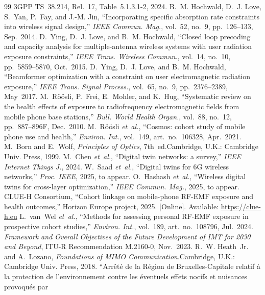 \documentclass[journal,twocolumn,10pt]{IEEEtran}
\theoremstyle{plain}
\theoremstyle{definition}
\theoremstyle{remark}
\begin{document}
\begin{thebibliography}{99}
3GPP TS~38.214, Rel.~17, Table~5.1.3.1-2, 2024.
 B.~M. Hochwald, D.~J. Love, S.~Yan, P.~Fay,
and J.-M. Jin, ``Incorporating specific absorption rate constraints
into wireless signal design,'' \emph{IEEE Commun. Mag.}, vol.~52,
no.~9, pp.~126--133, Sep.~2014.
 D.~Ying, D.~J. Love, and B.~M. Hochwald, ``Closed
loop precoding and capacity analysis for multiple-antenna wireless
systems with user radiation exposure constraints,'' \emph{IEEE
Trans. Wireless Commun.}, vol.~14, no.~10, pp.~5859--5870,
Oct.~2015.
 D.~Ying, D.~J. Love, and B.~M. Hochwald,
``Beamformer optimization with a constraint on user electromagnetic
radiation exposure,'' \emph{IEEE Trans. Signal Process.}, vol.~65,
no.~9, pp.~2376--2389, May~2017.
 M.~R\"o\"osli, P.~Frei, E.~Mohler, and K.~Hug,
``Systematic review on the health effects of exposure to
radiofrequency electromagnetic fields from mobile phone base
stations,'' \emph{Bull. World Health Organ.}, vol.~88, no.~12,
pp.~887--896F, Dec.~2010.
 M.~R\"o\"osli \emph{et~al.}, ``Cosmos: cohort
study of mobile phone use and health,'' \emph{Environ. Int.},
vol.~149, art.~no.~106328, Apr.~2021.
 M.~Born and E.~Wolf, \emph{Principles of
Optics}, 7th~ed.\quad Cambridge, U.K.: Cambridge Univ. Press,
1999.
 M.~Chen \emph{et~al.}, ``Digital twin
networks: a survey,'' \emph{IEEE Internet Things J.}, 2024.
 W.~Saad \emph{et~al.}, ``Digital twins for
6G wireless networks,'' \emph{Proc. IEEE}, 2025, to appear.
 O.~Hashash \emph{et~al.}, ``Wireless
digital twins for cross-layer optimization,'' \emph{IEEE Commun.
Mag.}, 2025, to appear.
 CLUE-H Consortium, ``Cohort linkage on
mobile-phone RF-EMF exposure and health outcomes,'' Horizon Europe
project, 2025. [Online]. Available: \url{https://clue-h.eu}
 L.~van~Wel \emph{et~al.}, ``Methods for
assessing personal RF-EMF exposure in prospective cohort studies,''
\emph{Environ. Int.}, vol.~189, art.~no.~108796, Jul.~2024.
 \emph{Framework and Overall Objectives of the
Future Development of IMT for 2030 and Beyond}, ITU-R
Recommendation M.2160-0, Nov.~2023.
 R.~W. Heath~Jr. and A.~Lozano,
\emph{Foundations of MIMO Communication}.\quad Cambridge, U.K.:
Cambridge Univ. Press, 2018.
 ``Arr\^et\'e de la R\'egion de
Bruxelles-Capitale relatif \`a la protection de l'environnement
contre les \'eventuels effets nocifs et nuisances provoqu\'es par

\end{thebibliography}
\end{document}
